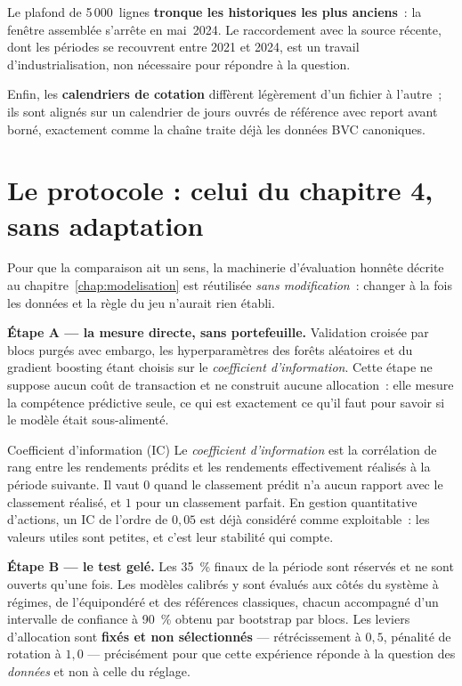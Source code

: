 Le plafond de 5\,000~lignes \textbf{tronque les historiques les plus anciens}~:
la fenêtre assemblée s'arrête en mai~2024. Le raccordement avec la source
récente, dont les périodes se recouvrent entre 2021 et 2024, est un travail
d'industrialisation, non nécessaire pour répondre à la question.

Enfin, les \textbf{calendriers de cotation} diffèrent légèrement d'un fichier à
l'autre~; ils sont alignés sur un calendrier de jours ouvrés de référence avec
report avant borné, exactement comme la chaîne traite déjà les données BVC
canoniques.

\section{Le protocole : celui du chapitre 4, sans adaptation}

Pour que la comparaison ait un sens, la machinerie d'évaluation honnête décrite
au chapitre~\ref{chap:modelisation} est réutilisée \emph{sans modification}~:
changer à la fois les données et la règle du jeu n'aurait rien établi.

\textbf{Étape A — la mesure directe, sans portefeuille.} Validation croisée
par blocs purgés avec embargo, les hyperparamètres des forêts aléatoires et du
gradient boosting étant choisis sur le \emph{coefficient d'information}. Cette
étape ne suppose aucun coût de transaction et ne construit aucune allocation~:
elle mesure la compétence prédictive seule, ce qui est exactement ce qu'il faut
pour savoir si le modèle était sous-alimenté.

\begin{definitionbox}{Coefficient d'information (IC)}
Le \emph{coefficient d'information} est la corrélation de rang entre les
rendements prédits et les rendements effectivement réalisés à la période
suivante. Il vaut $0$ quand le classement prédit n'a aucun rapport avec le
classement réalisé, et $1$ pour un classement parfait. En gestion quantitative
d'actions, un IC de l'ordre de $0{,}05$ est déjà considéré comme exploitable~:
les valeurs utiles sont petites, et c'est leur stabilité qui compte.
\end{definitionbox}

\textbf{Étape B — le test gelé.} Les 35~\% finaux de la période sont réservés
et ne sont ouverts qu'une fois. Les modèles calibrés y sont évalués aux côtés
du système à régimes, de l'équipondéré et des références classiques, chacun
accompagné d'un intervalle de confiance à 90~\% obtenu par bootstrap par blocs.
Les leviers d'allocation sont \textbf{fixés et non sélectionnés} — rétrécissement
à $0{,}5$, pénalité de rotation à $1{,}0$ — précisément pour que cette
expérience réponde à la question des \emph{données} et non à celle du réglage.

